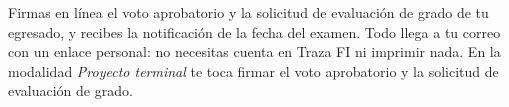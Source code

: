 \documentclass[11pt,a4paper]{article}
\begin{document}
{\small\tableofcontents}
\newpage
\begin{quevasahacer}
Firmas en línea el voto aprobatorio y la solicitud de evaluación de grado de tu egresado, y recibes la notificación de la fecha del examen. Todo llega a tu correo con un enlace personal: no necesitas cuenta en Traza FI ni imprimir nada. En la modalidad \emph{Proyecto terminal} te toca firmar el voto aprobatorio y la solicitud de evaluación de grado.
\end{quevasahacer}




\end{document}
